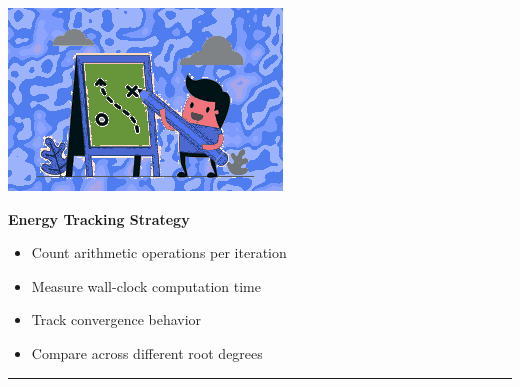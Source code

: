 \documentclass[
  letterpaper,
  DIV=11,
  numbers=noendperiod]{scrartcl}
\providecommand{\tightlist}{%
  \setlength{\itemsep}{0pt}\setlength{\parskip}{0pt}}
\begin{document}
\includegraphics[width=0.45\linewidth,height=\textheight,keepaspectratio]{graphics/strategy_i.png}

\textbf{Energy Tracking Strategy}

\begin{itemize}
\tightlist
\item
  Count arithmetic operations per iteration
\item
  Measure wall-clock computation time\\
\item
  Track convergence behavior
\item
  Compare across different root degrees
\end{itemize}

\begin{center}\rule{0.5\linewidth}{0.5pt}\end{center}
\end{document}
